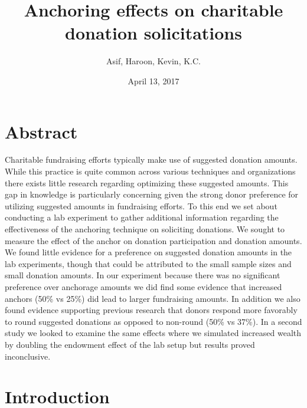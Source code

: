 \documentclass[]{article}
\title{Anchoring effects on charitable donation solicitations}
\author{Asif, Haroon, Kevin, K.C.}
\date{April 13, 2017}
\begin{document}
\maketitle

\section{Abstract}\label{abstract}

Charitable fundraising efforts typically make use of suggested donation
amounts. While this practice is quite common across various techniques
and organizations there exists little research regarding optimizing
these suggested amounts. This gap in knowledge is particularly
concerning given the strong donor preference for utilizing suggested
amounts in fundraising efforts. To this end we set about conducting a
lab experiment to gather additional information regarding the
effectiveness of the anchoring technique on soliciting donations. We
sought to measure the effect of the anchor on donation participation and
donation amounts. We found little evidence for a preference on suggested
donation amounts in the lab experiments, though that could be attributed
to the small sample sizes and small donation amounts. In our experiment
because there was no significant preference over anchorage amounts we
did find some evidence that increased anchors (50\% vs 25\%) did lead to
larger fundraising amounts. In addition we also found evidence
supporting previous research that donors respond more favorably to round
suggested donations as opposed to non-round (50\% vs 37\%). In a second
study we looked to examine the same effects where we simulated increased
wealth by doubling the endowment effect of the lab setup but results
proved inconclusive.

\newpage

\section{Introduction}\label{introduction}
\end{document}
